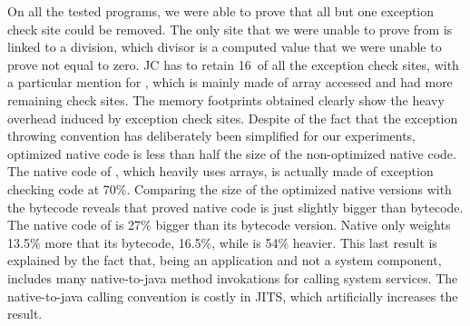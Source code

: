 On all the tested programs, we were able to prove that all but one exception check site could be removed. The only site that we were unable to prove from  is linked to a division, which divisor is a computed value that we were unable to prove not equal to zero. JC has to retain 16\ of all the exception check sites, with a particular mention for , which is mainly made of array accessed and had more remaining check sites.
The memory footprints obtained clearly show the heavy overhead induced
by exception check sites. Despite of the fact that the exception
throwing convention has deliberately been simplified for our
experiments, optimized native code is less than half the size of the
non-optimized native code. The native code of , which
heavily uses arrays, is actually made of exception checking code at
70\%.
Comparing the size of the optimized native versions with the bytecode
reveals that proved native code is just slightly bigger than
bytecode. The native code of  is 27\% bigger than its
bytecode version. Native  only weights 13.5\%
more that its bytecode,  16.5\%, while
 is 54\% heavier. This last result is explained by
the fact that, being an application and not a system component,
 includes many native-to-java method invokations
for calling system services. The native-to-java calling convention is
costly in JITS, which artificially increases the result.


